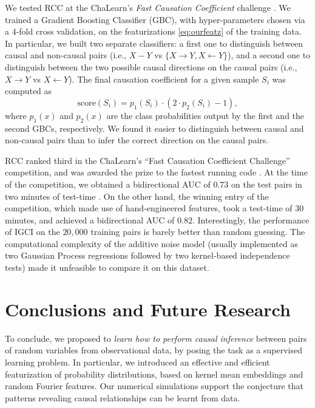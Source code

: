\documentclass[twoside,11pt,a4paper]{article}
\begin{document}
We tested RCC at the ChaLearn's
\emph{Fast Causation Coefficient} challenge \citep{Codalab14}.  We trained a
Gradient Boosting Classifier (GBC), with hyper-parameters chosen via a 4-fold
cross validation, on the featurizations \eqref{eq:ourfeatz} of the training
data. In particular, we built two separate classifiers: a first one to
distinguish between causal and non-causal pairs (i.e., $X-Y$ vs $\{X\rightarrow
Y, X\leftarrow Y\}$), and a second one to distinguish between the two possible
causal directions on the causal pairs (i.e., $X\rightarrow Y$ vs $X\leftarrow
Y$). The final causation coefficient for a given sample $S_i$ was computed as
$$\mathrm{score}(S_i) = p_1(S_i)\cdot(2\cdot p_2(S_i)-1),$$ where $p_1(x)$ and
$p_2(x)$ are the class probabilities output by the first and the second GBCs,
respectively. We found it easier to distinguish between causal and non-causal
pairs than to infer the correct direction on the causal pairs.

RCC ranked third in the ChaLearn's ``Fast Causation Coefficient Challenge''
competition, and was awarded the prize to the fastest running code
\citep{Codalab14}.
%
At the time of the competition, we obtained a bidirectional AUC of $0.73$
on the test pairs in two minutes of test-time \citep{Codalab14}.
%
On the other hand, the winning entry of the competition, which made use of
hand-engineered features, took a test-time of 30 minutes, and achieved a
bidirectional AUC of $0.82$.
%
Interestingly, the performance of IGCI on the $20,000$ training pairs is barely
better than random guessing. The computational complexity of the additive noise
model (usually implemented as two Gaussian Process regressions followed by two
kernel-based independence tests) made it unfeasible to compare it on this
dataset. 

\section{Conclusions and Future Research}\label{sec:future}
To conclude, we proposed to \emph{learn how to perform causal inference} between pairs
of random variables from observational data, by posing the task as a
supervised learning problem. In particular, we introduced an effective and
efficient featurization of probability distributions, based on kernel mean
embeddings and random Fourier features. Our numerical simulations support the
conjecture that patterns revealing causal relationships can be learnt from
data.
\end{document}
